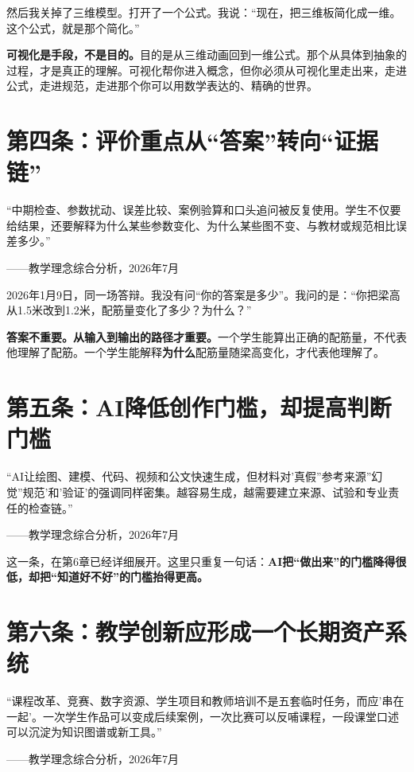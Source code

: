 然后我关掉了三维模型。打开了一个公式。我说：``现在，把三维板简化成一维。这个公式，就是那个简化。''

\textbf{可视化是手段，不是目的。}目的是从三维动画回到一维公式。那个从具体到抽象的过程，才是真正的理解。可视化帮你进入概念，但你必须从可视化里走出来，走进公式，走进规范，走进那个你可以用数学表达的、精确的世界。

\section{第四条：评价重点从``答案''转向``证据链''}

\begin{shiyu-inline}
``中期检查、参数扰动、误差比较、案例验算和口头追问被反复使用。学生不仅要给结果，还要解释为什么某些参数变化、为什么某些图不变、与教材或规范相比误差多少。''

\hfill ——教学理念综合分析，2026年7月
\end{shiyu-inline}

2026年1月9日，同一场答辩。我没有问``你的答案是多少''。我问的是：``你把梁高从1.5米改到1.2米，配筋量变化了多少？为什么？''

\textbf{答案不重要。从输入到输出的路径才重要。}一个学生能算出正确的配筋量，不代表他理解了配筋。一个学生能解释\textbf{为什么}配筋量随梁高变化，才代表他理解了。

\section{第五条：AI降低创作门槛，却提高判断门槛}

\begin{shiyu-inline}
``AI让绘图、建模、代码、视频和公文快速生成，但材料对'真假''参考来源''幻觉''规范'和'验证'的强调同样密集。越容易生成，越需要建立来源、试验和专业责任的检查链。''

\hfill ——教学理念综合分析，2026年7月
\end{shiyu-inline}

这一条，在第6章已经详细展开。这里只重复一句话：\textbf{AI把``做出来''的门槛降得很低，却把``知道好不好''的门槛抬得更高。}

\section{第六条：教学创新应形成一个长期资产系统}

\begin{shiyu-inline}
``课程改革、竞赛、数字资源、学生项目和教师培训不是五套临时任务，而应'串在一起'。一次学生作品可以变成后续案例，一次比赛可以反哺课程，一段课堂口述可以沉淀为知识图谱或新工具。''

\hfill ——教学理念综合分析，2026年7月
\end{shiyu-inline}

